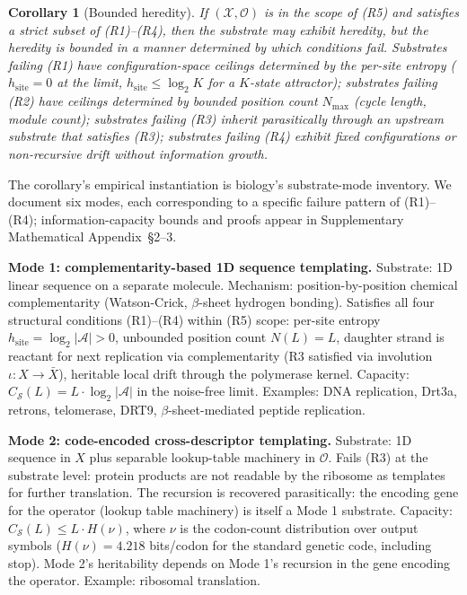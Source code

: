 \documentclass[aps,prx,reprint,amsmath,amssymb,floatfix,superscriptaddress,nofootinbib]{revtex4-2}
\theoremstyle{plain-thm}
\newtheorem{corollary}[theorem]{Corollary}
\theoremstyle{definition-thm}
\newcommand{\Csub}{C_{\mathcal{S}}}
\newcommand{\Xset}{\mathcal{X}}
\newcommand{\Op}{\mathcal{O}}
\begin{document}
\begin{corollary}[Bounded heredity]
\label{cor:bounded}
If $(\Xset, \Op)$ is in the scope of (R5) and satisfies a strict subset of \textnormal{(R1)--(R4)}, then the substrate may exhibit heredity, but the heredity is bounded in a manner determined by which conditions fail. Substrates failing (R1) have configuration-space ceilings determined by the per-site entropy ($h_{\mathrm{site}} = 0$ at the limit, $h_{\mathrm{site}} \le \log_2 K$ for a $K$-state attractor); substrates failing (R2) have ceilings determined by bounded position count $N_{\max}$ (cycle length, module count); substrates failing (R3) inherit parasitically through an upstream substrate that satisfies (R3); substrates failing (R4) exhibit fixed configurations or non-recursive drift without information growth.
\end{corollary}

The corollary's empirical instantiation is biology's substrate-mode inventory. We document six modes, each corresponding to a specific failure pattern of (R1)--(R4); information-capacity bounds and proofs appear in Supplementary Mathematical Appendix~\S2--3.

\textbf{Mode 1: complementarity-based 1D sequence templating.} Substrate: 1D linear sequence on a separate molecule. Mechanism: position-by-position chemical complementarity (Watson-Crick, $\beta$-sheet hydrogen bonding). Satisfies all four structural conditions (R1)--(R4) within (R5) scope: per-site entropy $h_{\mathrm{site}} = \log_2 |\mathcal{A}| > 0$, unbounded position count $N(L) = L$, daughter strand is reactant for next replication via complementarity (R3 satisfied via involution $\iota: X \to \bar{X}$), heritable local drift through the polymerase kernel. Capacity: $\Csub(L) = L \cdot \log_2 |\mathcal{A}|$ in the noise-free limit. Examples: DNA replication, Drt3a, retrons, telomerase, DRT9, $\beta$-sheet-mediated peptide replication.

\textbf{Mode 2: code-encoded cross-descriptor templating.} Substrate: 1D sequence in $X$ plus separable lookup-table machinery in $\Op$. Fails (R3) at the substrate level: protein products are not readable by the ribosome as templates for further translation. The recursion is recovered parasitically: the encoding gene for the operator (lookup table machinery) is itself a Mode 1 substrate. Capacity: $\Csub(L) \le L \cdot H(\nu)$, where $\nu$ is the codon-count distribution over output symbols ($H(\nu) = 4.218$ bits/codon for the standard genetic code, including stop). Mode 2's heritability depends on Mode 1's recursion in the gene encoding the operator. Example: ribosomal translation.
\end{document}
